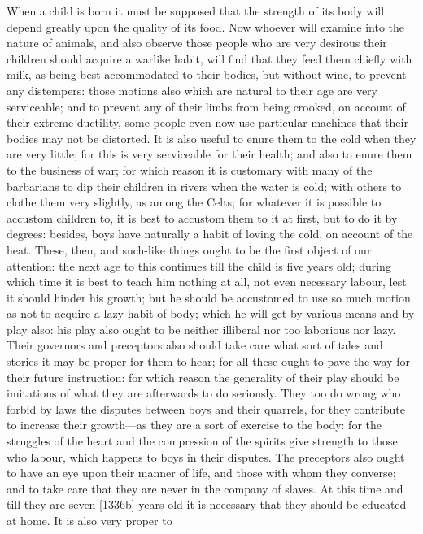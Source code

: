 
When a child is born it must be supposed that the strength of its body
will depend greatly upon the quality of its food. Now whoever will examine
into the nature of animals, and also observe those people who are very
desirous their children should acquire a warlike habit, will find that
they feed them chiefly with milk, as being best accommodated to their
bodies, but without wine, to prevent any distempers: those motions also
which are natural to their age are very serviceable; and to prevent any of
their limbs from being crooked, on account of their extreme ductility,
some people even now use particular machines that their bodies may not be
distorted. It is also useful to enure them to the cold when they are very
little; for this is very serviceable for their health; and also to enure
them to the business of war; for which reason it is customary with many of
the barbarians to dip their children in rivers when the water is cold;
with others to clothe them very slightly, as among the Celts; for whatever
it is possible to accustom children to, it is best to accustom them to it
at first, but to do it by degrees: besides, boys have naturally a habit of
loving the cold, on account of the heat. These, then, and such-like things
ought to be the first object of our attention: the next age to this
continues till the child is five years old; during which time it is best
to teach him nothing at all, not even necessary labour, lest it should
hinder his growth; but he should be accustomed to use so much motion as
not to acquire a lazy habit of body; which he will get by various means
and by play also: his play also ought to be neither illiberal nor too
laborious nor lazy. Their governors and preceptors also should take care
what sort of tales and stories it may be proper for them to hear; for all
these ought to pave the way for their future instruction: for which reason
the generality of their play should be imitations of what they are
afterwards to do seriously. They too do wrong who forbid by laws the
disputes between boys and their quarrels, for they contribute to increase
their growth—as they are a sort of exercise to the body: for the
struggles of the heart and the compression of the spirits give strength to
those who labour, which happens to boys in their disputes. The preceptors
also ought to have an eye upon their manner of life, and those with whom
they converse; and to take care that they are never in the company of
slaves. At this time and till they are seven [1336b] years old it is
necessary that they should be educated at home. It is also very proper to
